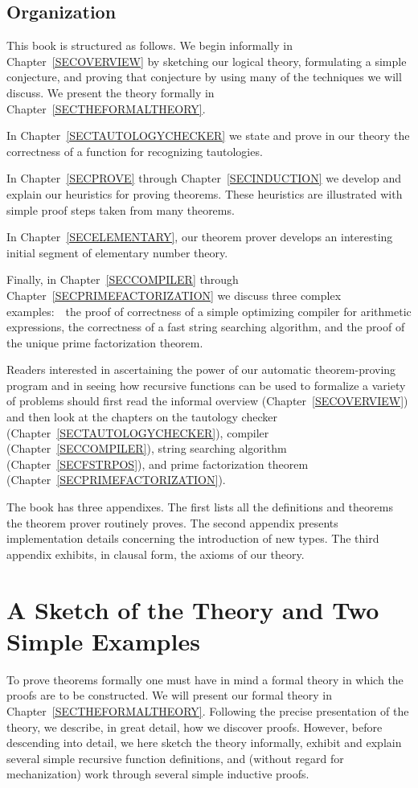 \documentclass[10pt]{book}
\begin{document}
\section{Organization}
This book is structured as follows.  We begin informally
in Chapter~\ref{SECOVERVIEW} by sketching our logical theory,
formulating a simple conjecture, and proving that conjecture by using  many of the
techniques we will discuss.
We present the theory formally in Chapter~\ref{SECTHEFORMALTHEORY}.

In Chapter~\ref{SECTAUTOLOGYCHECKER}
we state and prove in our theory the correctness of a  function for recognizing
tautologies.

In Chapter~\ref{SECPROVE} through Chapter~\ref{SECINDUCTION} we develop
and explain our heuristics for proving theorems.  These heuristics are
illustrated with simple proof steps taken from many theorems.

In Chapter~\ref{SECELEMENTARY}, our theorem prover develops an interesting
initial segment of elementary number theory.

Finally, in Chapter~\ref{SECCOMPILER} through Chapter~\ref{SECPRIMEFACTORIZATION} we
discuss three complex examples:~~the proof of correctness of
a simple optimizing compiler for arithmetic expressions, the
correctness of a fast string searching algorithm, and the proof of
the unique prime factorization theorem.

Readers interested in ascertaining the
power of our automatic theorem-proving program and in seeing how recursive functions
can be used to formalize a variety of problems should first read the informal
overview (Chapter~\ref{SECOVERVIEW}) and then look at the chapters
on the tautology checker (Chapter~\ref{SECTAUTOLOGYCHECKER}), compiler (Chapter~\ref{SECCOMPILER}),
string searching algorithm (Chapter~\ref{SECFSTRPOS}), and prime
factorization theorem (Chapter~\ref{SECPRIMEFACTORIZATION}).

The book has three appendixes.  The first lists all the definitions
and theorems the theorem prover routinely proves.
The second appendix presents implementation details concerning
the introduction of new types.
The third appendix exhibits, in clausal form, the  axioms of our
theory.

\chapter{A Sketch of the Theory and Two Simple Examples}
\pagestyle{headings}
\label{SECOVERVIEW}
To prove theorems formally one must have in mind a formal theory in
which the proofs are to be constructed.  We will present our formal
theory in Chapter~\ref{SECTHEFORMALTHEORY}.  Following the precise presentation
of the theory, we describe, in great detail, how we discover
proofs.  However, before descending into detail, we here sketch the
theory informally, exhibit and explain several simple recursive function
definitions, and (without regard for mechanization) work through several
simple inductive proofs.
\end{document}
